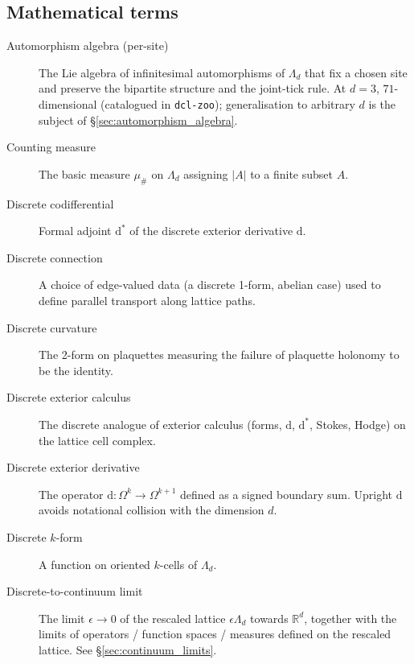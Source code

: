 \subsection*{Mathematical terms}

\begin{description}
\item[Automorphism algebra (per-site)]
   The Lie algebra of infinitesimal automorphisms of $\Lambda_d$ that
   fix a chosen site and preserve the bipartite structure and the
   joint-tick rule.  At $d = 3$, $71$-dimensional (catalogued in
   \texttt{dcl-zoo}); generalisation to arbitrary $d$ is the subject
   of \S\ref{sec:automorphism_algebra}.

\item[Counting measure]
   The basic measure $\mu_\#$ on $\Lambda_d$ assigning $|A|$ to a
   finite subset $A$.

\item[Discrete codifferential]
   Formal adjoint $\mathrm{d}^\ast$ of the discrete exterior
   derivative $\mathrm{d}$.

\item[Discrete connection]
   A choice of edge-valued data (a discrete 1-form, abelian case)
   used to define parallel transport along lattice paths.

\item[Discrete curvature]
   The 2-form on plaquettes measuring the failure of plaquette
   holonomy to be the identity.

\item[Discrete exterior calculus]
   The discrete analogue of exterior calculus (forms, $\mathrm{d}$,
   $\mathrm{d}^\ast$, Stokes, Hodge) on the lattice cell complex.

\item[Discrete exterior derivative]
   The operator $\mathrm{d} \colon \Omega^k \to \Omega^{k+1}$
   defined as a signed boundary sum.  Upright $\mathrm{d}$ avoids
   notational collision with the dimension $d$.

\item[Discrete $k$-form]
   A function on oriented $k$-cells of $\Lambda_d$.

\item[Discrete-to-continuum limit]
   The limit $\epsilon \to 0$ of the rescaled lattice
   $\epsilon \Lambda_d$ towards $\mathbb{R}^d$, together with the
   limits of operators / function spaces / measures defined on the
   rescaled lattice.  See \S\ref{sec:continuum_limits}.


\end{description}
